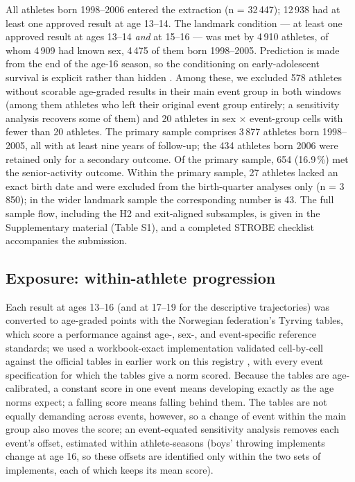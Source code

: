\documentclass[12pt,a4paper]{article}
\begin{document}
All athletes born 1998--2006 entered the extraction (n = 32\,447); 12\,938 had at least one approved result at age 13--14. The landmark condition --- at least one approved result at ages 13--14 \emph{and} at 15--16 --- was met by 4\,910 athletes, of whom 4\,909 had known sex, 4\,475 of them born 1998--2005. Prediction is made from the end of the age-16 season, so the conditioning on early-adolescent survival is explicit rather than hidden \citep{anderson1983}. Among these, we excluded 578 athletes without scorable age-graded results in their main event group in both windows (among them athletes who left their original event group entirely; a sensitivity analysis recovers some of them) and 20 athletes in sex $\times$ event-group cells with fewer than 20 athletes. The primary sample comprises 3\,877 athletes born 1998--2005, all with at least nine years of follow-up; the 434 athletes born 2006 were retained only for a secondary outcome. Of the primary sample, 654 (16.9\,\%) met the senior-activity outcome. Within the primary sample, 27 athletes lacked an exact birth date and were excluded from the birth-quarter analyses only (n = 3\,850); in the wider landmark sample the corresponding number is 43. The full sample flow, including the H2 and exit-aligned subsamples, is given in the Supplementary material (Table S1), and a completed STROBE checklist accompanies the submission.

\subsection{Exposure: within-athlete progression}

Each result at ages 13--16 (and at 17--19 for the descriptive trajectories) was converted to age-graded points with the Norwegian federation's Tyrving tables, which score a performance against age-, sex-, and event-specific reference standards; we used a workbook-exact implementation validated cell-by-cell against the official tables in earlier work on this registry \citep{guttormsen2026dropout,nfif2014}, with every event specification for which the tables give a norm scored. Because the tables are age-calibrated, a constant score in one event means developing exactly as the age norms expect; a falling score means falling behind them. The tables are not equally demanding across events, however, so a change of event within the main group also moves the score; an event-equated sensitivity analysis removes each event's offset, estimated within athlete-seasons (boys' throwing implements change at age 16, so these offsets are identified only within the two sets of implements, each of which keeps its mean score).
\end{document}
